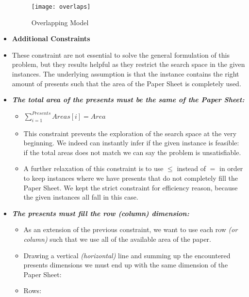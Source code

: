 \begin{itemize}
        \begin{figure}[ht]
            \centering
            \texttt{[image: overlaps]}
            \caption{Overlapping Model}
            \label{fig:overlaps}
        \end{figure}
    \newpage
    \item[] \textbf{Additional Constraints}
    \item[] These constraint are not essential to solve the general formulation of this problem,
        but they results helpful as they restrict the search space in the given instances.
        The underlying assumption is that the instance contains the right amount of presents such
        that the area of the Paper Sheet is completely used.
    \item \textbf{\textit{The total area of the presents must be the same of the Paper Sheet:}}
        \begin{itemize}
            \item[] $\sum_{i = 1}^{Presents}{Areas[i]} = Area$
            \item[] This constraint prevents the exploration of the search space
                at the very beginning. We indeed can instantly infer if the given instance is
                feasible: if the total areas does not match we can say the problem is unsatisfiable.
            \item[] A further relaxation of this constraint is to use $\leq$ instead of $=$ in order 
                to keep instances where we have presents that do not completely fill the Paper Sheet. 
                We kept the strict constraint for efficiency reason, because the given instances all fall
                in this case.
        \end{itemize}
    \newpage
    \item \textbf{\textit{The presents must fill the row (column) dimension:}}
        \begin{itemize}
            \item[] As an extension of the previous constraint, we want to use each row \textit{(or column)}
                such that we use all of the available area of the paper.
            \item[] Drawing a vertical \textit{(horizontal)} line and summing up the encountered
                presents dimensions we must end up with the same dimension of the Paper Sheet:
            \item[] Rows:
            \begin{adjustwidth}{-3.3cm}{}\begin{equation*}

\end{equation*}
\end{adjustwidth}
\end{itemize}
\end{itemize}
